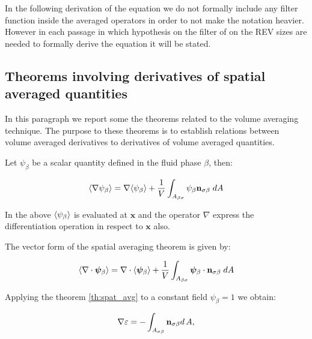 In the following derivation of the equation we do not formally include any filter function inside the averaged operators in order to not make the notation heavier.
However in each passage in which hypothesis on the filter of on the REV sizes are needed to formally derive the equation it will be stated.

\subsection{Theorems involving derivatives of spatial averaged quantities}

In this paragraph we report some the theorems related to the volume averaging technique. The purpose to these theorems is to establish relations between volume averaged derivatives to derivatives of volume averaged quantities.

\begin{theorem}
Let $\psi_{\beta}$ be a scalar quantity defined in the fluid phase $\beta$, then:

	\begin{equation}
		{\left< \nabla \psi_{\beta} \right>} = \nabla {\left< \psi_{\beta} \right>} + \dfrac{1}{V} \int_{A_{\beta \sigma}} \psi_{\beta} \mathbf{n}_{\sigma \beta}   \;dA
			\label{th:spat_avg}
	\end{equation}
\end{theorem}

In the above ${\left< \psi_{\beta} \right>}$ is evaluated at $\mathbf{x}$ and the operator $\nabla$ express the differentiation operation in respect to $\mathbf{x}$ also.

\begin{corollary}
	The vector form of the spatial averaging theorem is given by:
	
	\begin{equation}
	{\left< \nabla \cdot \boldsymbol{\psi}_{\beta} \right>} = \nabla \cdot {\left<  \boldsymbol{\psi}_{\beta} \right>} + \dfrac{1}{V} \int_{A_{\beta \sigma}}  \boldsymbol{\psi}_{\beta} \cdot \mathbf{n}_{\sigma \beta} \;dA
			\label{th:vec_spat_avg}
	\end{equation}
\end{corollary}

\begin{corollary}
	Applying the theorem \ref{th:spat_avg} to a constant field $\psi_{\beta} = 1$ we obtain:
	
	\begin{equation}
		\nabla \varepsilon = - \int_{A_{\sigma \beta}} \mathbf{n}_{\sigma \beta} d \, A,
	\end{equation}
\end{corollary}


